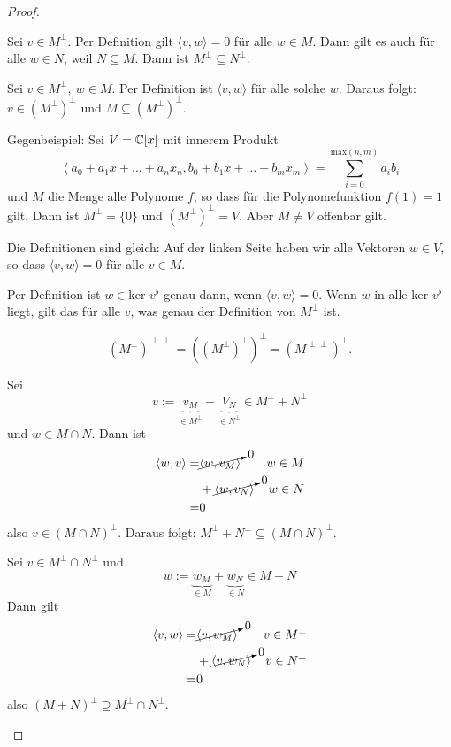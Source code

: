 \begin{proof}
\begin{parts}
\item Sei $v\in M^\perp$. Per Definition gilt $\langle v, w\rangle=0$ f\"{u}r alle $w\in M$. Dann gilt es auch f\"{u}r alle $w\in N$, weil $N\subseteq M$. Dann ist $M^\perp\subseteq N^\perp$.
\item Sei $v\in M^\perp,~w\in M$. Per Definition ist $\langle v,w\rangle$ f\"{u}r alle solche $w$. Daraus folgt: $v\in (M^\perp)^\perp$ und $M\subseteq (M^\perp)^\perp$.

	Gegenbeispiel: Sei $V=\mathbb{C}[x]$ mit innerem Produkt 
	 \[
		 \left<a_0+a_1x+\dots+a_n x_n, b_0+b_1x+\dots+b_mx_m \right> = \sum_{i=0}^{\text{max}(n,m)}a_ib_i
	 \]
	 und $M$ die Menge alle Polynome $f$, so dass f\"{u}r die Polynomefunktion $f(1)=1$ gilt. Dann ist $M^\perp=\{0\} $ und $(M^\perp)^\perp=V$. Aber $M\neq V$ offenbar gilt.
\item Die Definitionen sind gleich: Auf der linken Seite haben wir alle Vektoren $w\in V$, so dass $\langle v, w\rangle=0$ f\"{u}r alle $v\in M$.

	Per Definition ist $w\in \text{ker }v^\flat$ genau dann, wenn $\langle v, w\rangle=0$. Wenn $w$ in alle $\text{ker }v^\flat$ liegt, gilt das f\"{u}r alle $v$, was genau der Definition von $M^\perp$ ist.
\item 
	\[
		(M^\perp)^{\perp\perp}=((M^\perp)^\perp)^\perp=(M^{\perp\perp})^\perp
	.\] 
\item Sei
	\[
		v:=\underbrace{v_M}_{\in M^\perp}+\underbrace{V_N}_{\in N^\perp}\in M^\perp+N^\perp
	\] 
	und $w\in M\cap N$. Dann ist
	\begin{align*}
	\left<w,v \right> =& \cancelto{0}{\left<w, v_M \right>} & w\in M\\
			   &+\cancelto{0}{\left<w,v_N \right>} & w\in N\\
	=&0
	\end{align*}
	also $v\in (M\cap N)^\perp$. Daraus folgt: $M^\perp+N^\perp \subseteq (M\cap N)^\perp$.
\item Sei $v\in M^\perp\cap N^\perp$ und
	\[
		w:=\underbrace{w_M}_{\in M}+\underbrace{w_N}_{\in N}\in M+N
	\]
	Dann gilt
	\begin{align*}
		\left<v,w \right> =& \cancelto{0}{\left<v, w_M \right>} & v\in M^\perp\\
				   &+\cancelto{0}{\left<v,w_N \right>} & v\in N^\perp\\
		=&0
	\end{align*}
	also $(M+ N)^\perp \supseteq M^\perp \cap N^\perp$.


\end{parts}
\end{proof}

